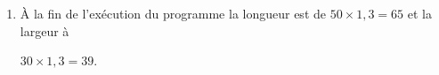 \begin{enumerate}
\begin{enumerate}
\medskip

		\item%
À la fin de l'exécution du programme la longueur est de $50 \times 1,3 = 65$ et la largeur à 

$30 \times 1,3 = 39$.
	\end{enumerate}
\end{enumerate}

\vspace{0,5cm}

